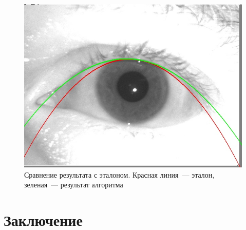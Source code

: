 \documentclass[12pt]{article} %
\begin{document}
\begin{figure}[h]
	
	\centering
	
	\includegraphics[width=0.6\linewidth]{compare.jpg}
	
	\caption{Сравнение результата с эталоном. Красная линия~--- эталон, зеленая~--- результат алгоритма}
	
	\label{fig:compare}
	
\end{figure}




\newpage
\section{Заключение}




\newpage



\nocite{Yang}
\end{document}
